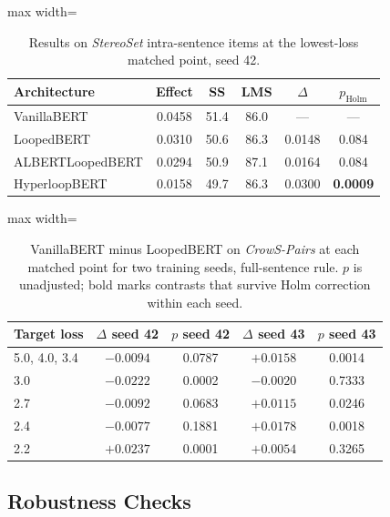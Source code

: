 \documentclass[sigconf,natbib=true]{acmart}
\begin{document}
\begin{table}[!htb]
\centering
\caption{Results on \emph{StereoSet} intra-sentence items at the lowest-loss
matched point, seed 42.}
\label{tab:stereoset}
\footnotesize
\begin{adjustbox}{max width=\columnwidth}
\begin{tabular}{lccccc}
\toprule
Architecture & Effect & SS & LMS & $\Delta$ & $p_{\text{Holm}}$ \\
\midrule
VanillaBERT \citep{devlin2019bert}     & 0.0458 & 51.4 & 86.0 & --- & --- \\
LoopedBERT   \citep{saunshi2025looped}    & 0.0310 & 50.6 & 86.3 & 0.0148 & 0.084 \\
ALBERTLoopedBERT \citep{lan2020albert} & 0.0294 & 50.9 & 87.1 & 0.0164 & 0.084 \\
HyperloopBERT \citep{zeitoun2026hyperloop}   & 0.0158 & 49.7 & 86.3 & 0.0300 & \textbf{0.0009} \\
\bottomrule
\end{tabular}
\end{adjustbox}
\end{table}

\begin{table}[!htb]
\centering
\caption{VanillaBERT minus LoopedBERT on \emph{CrowS-Pairs} at each matched
point for two training seeds, full-sentence rule. $p$ is unadjusted; bold
marks contrasts that survive Holm correction within each seed.}
\label{tab:seed}
\footnotesize
\begin{adjustbox}{max width=\columnwidth}
\begin{tabular}{lcccc}
\toprule
Target loss & $\Delta$ seed 42 & $p$ seed 42 & $\Delta$ seed 43 & $p$ seed 43 \\
\midrule
5.0, 4.0, 3.4 & $-0.0094$          & 0.0787 & $\mathbf{+0.0158}$ & 0.0014 \\
3.0           & $\mathbf{-0.0222}$ & 0.0002 & $-0.0020$          & 0.7333 \\
2.7           & $-0.0092$          & 0.0683 & $+0.0115$          & 0.0246 \\
2.4           & $-0.0077$          & 0.1881 & $\mathbf{+0.0178}$ & 0.0018 \\
2.2           & $\mathbf{+0.0237}$ & 0.0001 & $+0.0054$          & 0.3265 \\
\bottomrule
\end{tabular}
\end{adjustbox}
\end{table}

\subsection{Robustness Checks}
\label{sec:robust}
\end{document}
